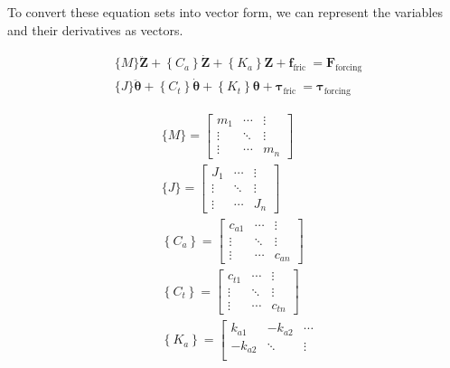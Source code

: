 To convert these equation sets into vector form, we can represent the variables and their derivatives as vectors.

\begin{equation}\label{Vector_form}
  \begin{aligned}
  & \{M\} \ddot{\boldsymbol{Z}}+\left\{C_a\right\} \dot{\boldsymbol{Z}}+\left\{K_a\right\} \boldsymbol{Z}+\boldsymbol{f}_{\text {fric }}=\boldsymbol{F}_{\text {forcing }} \\
  & \{J\} \ddot{\boldsymbol{\theta}}+\left\{C_t\right\} \dot{\boldsymbol{\theta}}+\left\{K_t\right\} \boldsymbol{\theta}+\boldsymbol{\tau}_{\text {fric }}=\boldsymbol{\tau}_{\text {forcing }}
  \end{aligned}
\end{equation}


\begin{equation}\label{12}
  \begin{aligned}
  & \{M\}=\left[\begin{array}{ccc}
  m_1 & \cdots & \vdots \\
  \vdots & \ddots & \vdots \\
  \vdots & \cdots & m_n
  \end{array}\right] \\
  & \{J\}=\left[\begin{array}{ccc}
  J_1 & \cdots & \vdots \\
  \vdots & \ddots & \vdots \\
  \vdots & \cdots & J_n
  \end{array}\right] \\
  & \left\{C_a\right\}=\left[\begin{array}{ccc}
  c_{a 1} & \cdots & \vdots \\
  \vdots & \ddots & \vdots \\
  \vdots & \cdots & c_{a n}
  \end{array}\right] \\
  & \left\{C_t\right\}=\left[\begin{array}{ccc}
  c_{t 1} & \cdots & \vdots \\
  \vdots & \ddots & \vdots \\
  \vdots & \cdots & c_{t n}
  \end{array}\right] \\
  & \left\{K_a\right\}=\left[\begin{array}{ccc}
  k_{a 1} & -k_{a 2} & \cdots \\
  -k_{a 2} & \ddots & \vdots \\

\end{array}
\end{aligned}
\end{equation}
